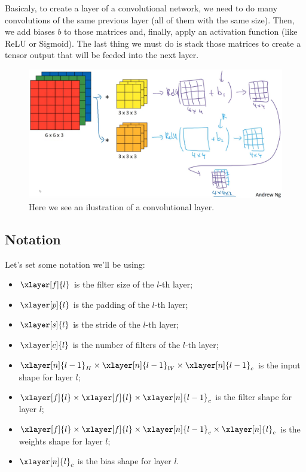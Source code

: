 \documentclass[12pt, a4paper, oneside]{book}
\begin{document}
Basicaly, to create a layer of a convolutional network, we need to do many
convolutions of the same previous layer (all of them with the same size). Then,
we add biases $b$ to those matrices and, finally, apply an activation function
(like ReLU or Sigmoid). The last thing we must do is stack those matrices to
create a tensor output that will be feeded into the next layer.

\begin{figure}[h]
\centering
\includegraphics[scale=0.3]{Res/one-layer-convolution.png}
\caption{Here we see an ilustration of a convolutional layer.}
\label{one-layer-convolution.png}
\end{figure}

\subsection{Notation}%
\label{sub:notation}

Let's set some notation we'll be using:
\begin{itemize}
    \item $\xlayer[f]{l}$ is the filter size of the $l$-th layer;
    \item $\xlayer[p]{l}$ is the padding of the $l$-th layer;
    \item $\xlayer[s]{l}$ is the stride of the $l$-th layer;
    \item $\xlayer[c]{l}$ is the number of filters of the $l$-th layer;
    \item $\xlayer[n]{l-1}_H\times\xlayer[n]{l-1}_W\times\xlayer[n]{l-1}_c$ is
        the input shape for layer $l$;
    \item $\xlayer[f]{l}\times\xlayer[f]{l}\times\xlayer[n]{l-1}_c$ is
        the filter shape for layer $l$;
    \item $\xlayer[f]{l}\times\xlayer[f]{l}\times\xlayer[n]{l-1}_c\times
        \xlayer[n]{l}_c$ is the weights shape for layer $l$;
    \item $\xlayer[n]{l}_c$ is the bias shape for layer $l$.
\end{itemize}
\end{document}
